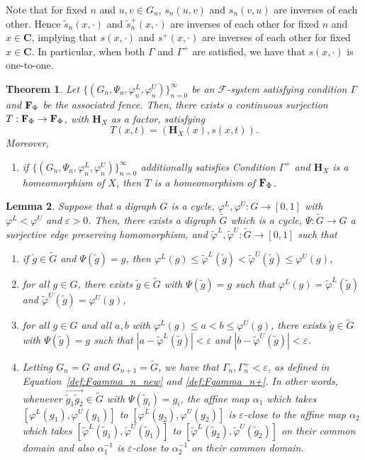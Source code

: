 \documentclass[11pt]{amsart}
\newtheorem{theorem}{Theorem}[section]
\newtheorem{lemma}[theorem]{Lemma}
\newcommand{\oa}{\overrightarrow}
\newcommand{\cantor}{\mathbf C}
\newcommand{\homeocantor}{{\mathbf H}_{X}}
\newcommand{\cF}{\mathcal{F}}
\newcommand{\fsystem}{\{(G_n, \Psi_n,\varphi^L_n,\varphi^U_n)\}_{n=0}^{\infty}}
\begin{document}
{Note that for fixed $n$ and $u,v \in G_n$, $s_n(u,v)$ and $s_n(v,u)$ are inverses of each other. Hence $\tilde s_n(x, \cdot)$ and $\tilde s_n^+(x, \cdot)$ are inverses of each other for fixed $n$ and $x \in \cantor$, implying that $s(x, \cdot)$ and $s^+(x, \cdot) $ are inverses of each other for fixed $x \in \cantor$. In particular, when both $\Gamma$ and $\Gamma ^+$ are satisfied, we have that $s(x,\cdot)$ is one-to-one.


\begin{theorem}\label{thm:main}
Let $\fsystem$ be an $\cF$-system satisfying condition $\Gamma$ and  ${\bf F}_{\Phi}$ be the associated fence. Then, there exists a continuous surjection $T: {\bf F}_{\Phi}\rightarrow {\bf F}_{\Phi}$, with $\homeocantor$ as a factor, satisfying \[T\left(x, t \right)=(\homeocantor(x), s(x,t)).\]
 Moreover, 
\begin{enumerate}  
    \item if $\fsystem$ additionally satisfies Condition $\Gamma^+$ and $\homeocantor$ is a homeomorphism of $X$, then $T$ is a homeomorphism of ${\bf F}_{\Phi}$.
\end{enumerate}
\end{theorem}
\begin{lemma}\label{lem:odometerminimal}
Suppose that a digraph $G$ is a cycle, 
   $\varphi^L, \varphi ^U: G \rightarrow [0,1]$ with $\varphi^L< \varphi^U$ and $\varepsilon >0$. Then, there exists a digraph $\tilde G$ which is a cycle, $\Psi: \tilde G \rightarrow G$ a surjective edge preserving homomorphism, and $\tilde\varphi^L, \tilde\varphi^U:\tilde G \rightarrow [0,1]$ such that 
   \begin{enumerate}[label=(\alph*)]
       \item if $\tilde g \in \tilde G$ and $\Psi(\tilde g) =g$, then $\varphi^L(g) \le \tilde\varphi^L(\tilde g) < \tilde\varphi^U(\tilde g)\le \varphi^U (g)$,
       \item for all $g \in G$, there exists  $\tilde g \in \tilde G$ with $\Psi(\tilde g) = g$ such that $\varphi^L(g) = \tilde\varphi^L(\tilde g)$ and $ \tilde\varphi^U(\tilde g)= \varphi^U (g)$,
       \item for all $g\in G$ and all $a, b$ with $ \varphi^L(g) \le a < b \le   \varphi^U (g)$, there exists  $\tilde g \in \tilde G$ with $\Psi(\tilde g) = g$ such that $|a- \tilde\varphi^L(\tilde g)| < \varepsilon$ and $ |b- \tilde\varphi^U(\tilde g)| < \varepsilon$.
      \item Letting $G_n = G$ and $G_{n+1} = \tilde G$, we have that $\Gamma_n, \Gamma^+_n < \varepsilon$, as defined in Equation~\eqref{def:Fgamma_n_new} and \eqref{def:Fgamma_n+}. In other words, whenever $\oa{\tilde g_1 \tilde g_2} \in \tilde G$ with $\Psi(\tilde g_i) = g_i$, the affine map $\alpha_1$ which takes $[\varphi^L(g_1), \varphi^U(g_1)]$ to $[\varphi^L(g_2), \varphi^U(g_2)]$ is $\varepsilon$-close to the affine map $\alpha_2$ which takes $[\tilde\varphi^L(\tilde g_1), \tilde\varphi^U(\tilde g_1)]$ to $[\tilde\varphi^L(\tilde g_2), \tilde\varphi^U(\tilde g_2)]$ on their common domain and also $\alpha_1^{-1}$ is $\varepsilon$-close to $\alpha_2^{-1}$ on their common domain.  

\end{enumerate}
\end{lemma}}
\end{document}

